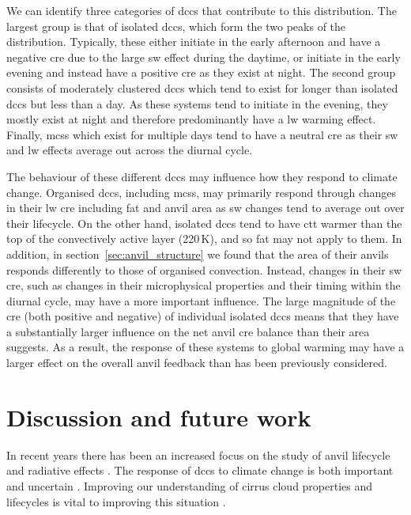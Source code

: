 We can identify three categories of \acrshort{dcc}s that contribute to this distribution.
The largest group is that of isolated \acrshort{dcc}s, which form the two peaks of the distribution.
Typically, these either initiate in the early afternoon and have a negative \acrshort{cre} due to the large \acrshort{sw} effect during the daytime, or initiate in the early evening and instead have a positive \acrshort{cre} as they exist at night.
The second group consists of moderately clustered \acrshort{dcc}s which tend to exist for longer than isolated \acrshort{dcc}s but less than a day.
As these systems tend to initiate in the evening, they mostly exist at night and therefore predominantly have a \acrshort{lw} warming effect.
Finally, \acrshort{mcs}s which exist for multiple days tend to have a neutral \acrshort{cre} as their \acrshort{sw} and \acrshort{lw} effects average out across the diurnal cycle.

The behaviour of these different \acrshort{dcc}s may influence how they respond to climate change.
Organised \acrshort{dcc}s, including \acrshort{mcs}s, may primarily respond through changes in their \acrshort{lw} \acrshort{cre} including \acrshort{fat} and anvil area as \acrshort{sw} changes tend to average out over their lifecycle.
On the other hand, isolated \acrshort{dcc}s tend to have \acrshort{ctt} warmer than the top of the convectively active layer (220\,\unit{K}), and so \acrshort{fat} may not apply to them.
In addition, in section~\ref{sec:anvil_structure} we found that the area of their anvils responds differently to those of organised convection.
Instead, changes in their \acrshort{sw} \acrshort{cre}, such as changes in their microphysical properties and their timing within the diurnal cycle, may have a more important influence.
The large magnitude of the \acrshort{cre} (both positive and negative) of individual isolated \acrshort{dcc}s means that they have a substantially larger influence on the net anvil \acrshort{cre} balance than their area suggests.
As a result, the response of these systems to global warming may have a larger effect on the overall anvil feedback than has been previously considered.



\section{Discussion and future work}

In recent years there has been an increased focus on the study of anvil lifecycle \citep{wall_life_2018, sokol_tropical_2020} and radiative effects \citep{bouniol_life_2021}.
The response of \acrshort{dcc}s to climate change is both important and uncertain \citep{sherwood_assessment_2020, hill_climate_2023}.
Improving our understanding of cirrus cloud properties and lifecycles is vital to improving this situation \citep{sullivan_ice_2021, gasparini_opinion_2023}.

